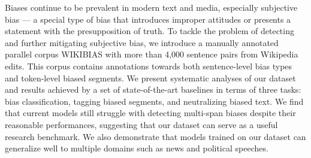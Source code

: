 Biases continue to be prevalent in modern text and media, especially subjective bias --- a special type of bias that introduces improper attitudes or presents a statement with the presupposition of truth. To tackle the problem of detecting and further mitigating subjective bias, we introduce a manually annotated parallel corpus WIKIBIAS with more than 4,000 sentence pairs from Wikipedia edits. This corpus contains annotations towards both sentence-level bias types and token-level biased segments. We present systematic analyses of our dataset and results achieved by a set of state-of-the-art baselines in terms of three tasks: bias classification, tagging biased segments, and neutralizing biased text. We find that current models still struggle with detecting multi-span biases despite their reasonable performances, suggesting that our dataset can serve as a useful research benchmark. We also demonstrate that models trained on our dataset can generalize well to multiple domains such as news and political speeches.
